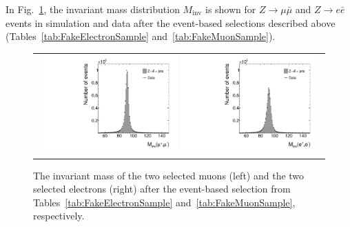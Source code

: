 In Fig.~\ref{fig:Zpeak}, the invariant mass distribution $M_{\text{inv}}$ is shown for $Z\rightarrow \mu \bar{\mu}$ and $Z\rightarrow e \bar{e}$ events in simulation and data after the event-based selections described above (Tables~\ref{tab:FakeElectronSample} and~\ref{tab:FakeMuonSample}).
\begin{figure}[!tb]
  \centering 
  \begin{tabular}{c}
    \includegraphics[width=0.49\textwidth]{figures/analysis_2/Background/hMinvMuons_lin_chiTracksnoSelectionTightMuons.pdf}
    \includegraphics[width=0.49\textwidth]{figures/analysis_2/Background/hMinvElectrons_lin_chiTracksnoSelectionTightElectrons.pdf}
  \end{tabular}
  \caption{The invariant mass of the two selected muons (left) and the two selected electrons (right) after the event-based selection from Tables~\ref{tab:FakeElectronSample} and~\ref{tab:FakeMuonSample}, respectively.}
  \label{fig:Zpeak}
\end{figure}


